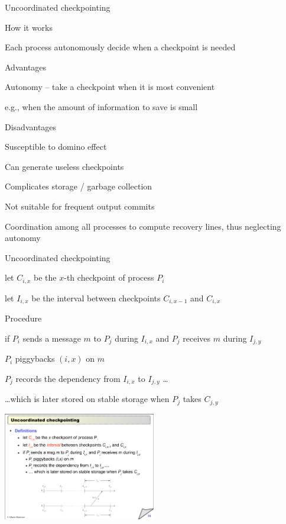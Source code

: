 \begin{frame}{Uncoordinated checkpointing}
	
\BI
\item How it works
\BI
\item Each process autonomously decide when a checkpoint is needed
\EI
\item Advantages
\BI
\item Autonomy – take a checkpoint when it is most convenient
\item e.g., when the amount of information to save is small
\EI
\item Disadvantages
\BI
\item Susceptible to domino effect
\item Can generate useless checkpoints
\item Complicates storage / garbage collection
\item Not suitable for frequent output commits
\item Coordination among all processes to compute recovery lines, thus neglecting autonomy	
\EI
\EI
	
\end{frame}

\begin{frame}{Uncoordinated checkpointing}

\begin{definition}
\BI
\item let $C_{i,x}$ be the $x$-th checkpoint of process $P_i$
\item let $I_{i,x}$ be the interval between checkpoints $C_{i,x-1}$ and $C_{i,x}$
\EI
\end{definition}

\begin{block}{Procedure}
\BI
\item  if $P_i$ sends a message $m$ to $P_j$ during $I_{i,x}$  and $P_j$ receives $m$ during $I_{j,y}$
\BI
\item $P_i$ piggybacks $(i,x)$ on $m$
\item $P_j$ records the dependency from $I_{i,x}$ to $I_{j,y}$ \ldots
\item \ldots which is later stored on stable storage when $P_j$ takes $C_{j,y}$
\EI
\EI
\end{block}

\vspace{-8pt}
\begin{center}
\includegraphics[width=0.5\textwidth]{recovery}
\end{center}

\end{frame}


